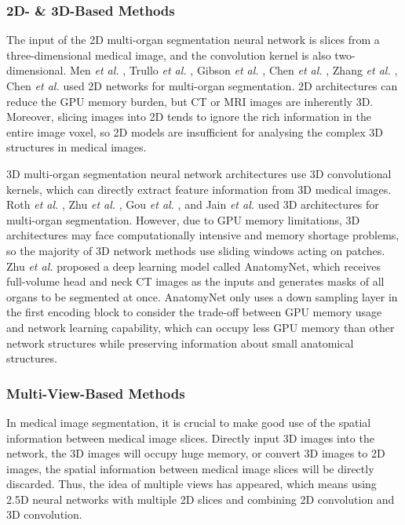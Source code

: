 \documentclass[lettersize,journal]{IEEEtran}
\begin{document}
\subsubsection{2D- \& 3D-Based Methods}
The input of the 2D multi-organ segmentation neural network is slices from a three-dimensional medical image, and the convolution kernel is also two-dimensional. Men {\it{et al.}} \cite{58}, Trullo {\it{et al.}} \cite{83}, Gibson {\it{et al.}} \cite{60}, Chen {\it{et al.}} \cite{44}, Zhang {\it{et al.}} \cite{48}, Chen {\it{et al.}} \cite{67} used 2D networks for multi-organ segmentation. 2D architectures can reduce the GPU memory burden, but CT or MRI images are inherently 3D. Moreover, slicing images into 2D tends to ignore the rich information in the entire image voxel, so 2D models are insufficient for analysing the complex 3D structures in medical images.

3D multi-organ segmentation neural network architectures use 3D convolutional kernels, which can directly extract feature information from 3D medical images. Roth {\it{et al.}} \cite{61}, Zhu {\it{et al.}} \cite{39}, Gou {\it{et al.}} \cite{42}, and Jain {\it{et al.}} \cite{156} used 3D architectures for multi-organ segmentation. However, due to GPU memory limitations, 3D architectures may face computationally intensive and memory shortage problems, so the majority of 3D network methods use sliding windows acting on patches. Zhu {\it{et al.}} \cite{39} proposed a deep learning model called AnatomyNet, which receives full-volume head and neck CT images as the inputs and generates masks of all organs to be segmented at once. AnatomyNet only uses a down sampling layer in the first encoding block to consider the trade-off between GPU memory usage and network learning capability, which can occupy less GPU memory than other network structures while preserving information about small anatomical structures.

\subsubsection{Multi-View-Based Methods}
In medical image segmentation, it is crucial to make good use of the spatial information between medical image slices. Directly input 3D images into the network, the 3D images will occupy huge memory, or convert 3D images to 2D images, the spatial information between medical image slices will be directly discarded. Thus, the idea of multiple views has appeared, which means using 2.5D neural networks with multiple 2D slices and combining 2D convolution and 3D convolution.
\end{document}
